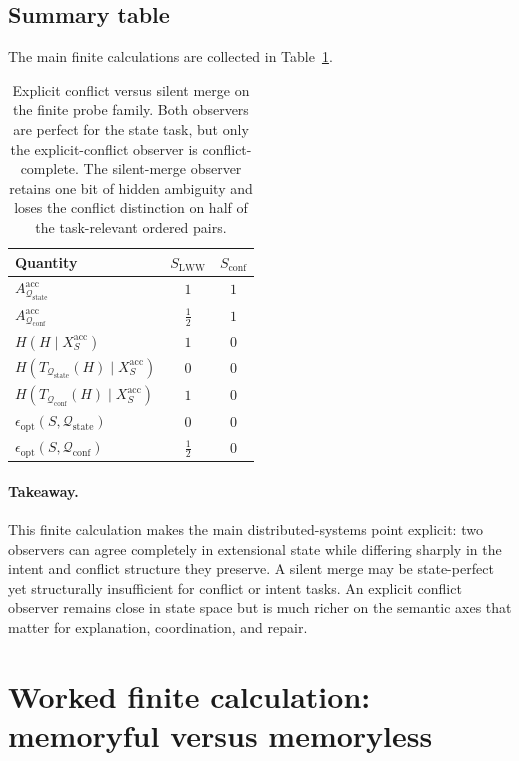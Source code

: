 \documentclass[11pt,twoside]{article}
\newcommand{\TableHeaderRow}{\rowcolor{tableheaderbg}\bfseries}
\theoremstyle{definition}
\newcommand{\acc}{\mathrm{acc}}
\begin{document}
\subsection{Summary table}
\label{app:conflict-summary}

The main finite calculations are collected in Table~\ref{tab:conflict-summary}.

\begin{table}[t]
\centering
\begin{tabular}{lcc}
\toprule
\TableHeaderRow
Quantity & \(S_{\mathrm{LWW}}\) & \(S_{\mathrm{conf}}\) \\
\midrule
\(A^{\acc}_{\mathcal{Q}_{\mathrm{state}}}\) & \(1\) & \(1\) \\
\(A^{\acc}_{\mathcal{Q}_{\mathrm{conf}}}\)  & \(\frac12\) & \(1\) \\
\(H(H\mid X_S^{\acc})\) & \(1\) & \(0\) \\
\(H(T_{\mathcal{Q}_{\mathrm{state}}}(H)\mid X_S^{\acc})\) & \(0\) & \(0\) \\
\(H(T_{\mathcal{Q}_{\mathrm{conf}}}(H)\mid X_S^{\acc})\) & \(1\) & \(0\) \\
\(\epsilon_{\mathrm{opt}}(S,\mathcal{Q}_{\mathrm{state}})\) & \(0\) & \(0\) \\
\(\epsilon_{\mathrm{opt}}(S,\mathcal{Q}_{\mathrm{conf}})\) & \(\frac12\) & \(0\) \\
\bottomrule
\end{tabular}
\caption{Explicit conflict versus silent merge on the finite probe family. Both observers are perfect for the state task, but only the explicit-conflict observer is conflict-complete. The silent-merge observer retains one bit of hidden ambiguity and loses the conflict distinction on half of the task-relevant ordered pairs.}
\label{tab:conflict-summary}
\end{table}

\paragraph{Takeaway.}
This finite calculation makes the main distributed-systems point explicit: two observers can agree completely in extensional state while differing sharply in the intent and conflict structure they preserve. A silent merge may be state-perfect yet structurally insufficient for conflict or intent tasks. An explicit conflict observer remains close in state space but is much richer on the semantic axes that matter for explanation, coordination, and repair.
\section{Worked finite calculation: memoryful versus memoryless}
\label{app:memoryful-vs-memoryless}
\end{document}
